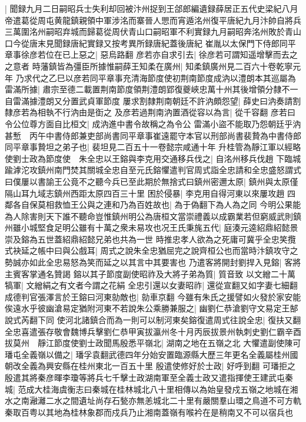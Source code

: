 |{
	聞録九月二日嗣昭兵士失利却回被汴州捉到王郃郎編遺録薛居正五代史梁紀八月帝遣葛從周屯黄龍鎮親領中軍涉洺而寨晉人愳而宵遁洺州復平唐紀九月汴帥自將兵三萬圍洺州嗣昭弃城而歸葛從周伏青山口嗣昭軍不利實録九月嗣昭奔洺州敗於青山口今從唐末見聞録唐紀實録又按考異所録唐紀蓋後唐紀}
崔胤以太保門下侍郎同平章事徐彦若位在已上惡之|{
	惡烏路翻}
彦若亦自求引去|{
	徐彦若可謂知遥增擊而去之之意者}
時藩鎮皆為彊臣所據惟嗣薛王知柔在廣州|{
	知柔鎮廣州見二百六十卷乾寧元年}
乃求代之乙巳以彦若同平章事充清海節度使初荆南節度成汭以澧朗本其巡屬為雷滿所據|{
	肅宗至德二載置荆南節度領荆澧朗郢復夔峽忠萬十州其後增領分隸不一自雷滿據澧朗又分置武貞軍節度}
屢求割隸荆南朝廷不許汭頗怨望|{
	薛史曰汭奏請割隸彦若為相執不行汭由是衘之}
及彦若過荆南汭置酒從容以為言|{
	從千容翻}
彦若曰令公位尊方面自比桓文|{
	成汭進中書令故稱之為令公}
雷滿小盜不能取乃怨朝廷乎汭甚慙　丙午中書侍郎兼吏部尚書同平章事崔遠罷守本官以刑部尚書裴贄為中書侍郎同平章事贄坦之弟子也|{
	裴坦見二百五十一卷懿宗咸通十年}
升桂管為靜江軍以經略使劉士政為節度使　朱全忠以王鎔與李克用交通移兵伐之|{
	自洺州移兵伐趙}
下臨城踰滹沱攻鎮州南門焚其關城全忠自至元氏鎔懼遣判官周式詣全忠請和全忠盛怒謂式曰僕屢以書諭王公竟不之聽今兵已至此期於無捨式曰鎮州密邇太原|{
	鎮州與太原僅隔山耳九域志鎮州西距太原四百三十里}
困於侵暴|{
	李克用自得河東以來屢攻趙}
四鄰各自保莫相救恤王公與之連和乃為百姓故也|{
	為于偽翻下為人為之同}
今明公果能為人除害則天下誰不聽命豈惟鎮州明公為唐桓文當崇禮義以成霸業若但窮威武則鎮州雖小城堅食足明公雖有十萬之衆未易攻也况王氏秉旄五代|{
	庭湊元逵紹鼎紹懿景崇及鎔為五世蓋紹鼎紹懿兄弟也共為一世}
時推忠孝人欲為之死庸可冀乎全忠笑攬式袂延之帳中曰與公戲耳|{
	周式之說朱全忠猶屈完之說齊桓公也而當時汴鎮攻守之勢誠亦如此全忠易怒為笑而延之以其言中其要害也}
乃遣客將開封劉捍入見鎔|{
	客將主賓客掌通名贊謁}
鎔以其子節度副使昭祚及大將子弟為質|{
	質音致}
以文繒二十萬犒軍|{
	文繒絹之有文者今謂之花絹}
全忠引還以女妻昭祚|{
	還從宣翻又如字妻七細翻}
成德判官張澤言於王鎔曰河東勍敵也|{
	勍車京翻}
今雖有朱氏之援譬如火發於家安能俟遠水乎彼幽滄易定猶附河東不若說朱公乘勝兼服之|{
	幽劉仁恭滄劉守文易定王郜說式芮翻下同}
使河北諸鎮合而為一則可以制河東矣鎔復遣周式往說全忠|{
	復扶又翻}
全忠喜遣張存敬會魏博兵擊劉仁恭甲寅拔瀛州冬十月丙辰拔景州執刺史劉仁霸辛酉拔莫州　靜江節度使劉士政聞馬殷悉平嶺北|{
	湖南之地在五嶺之北}
大懼遣副使陳可璠屯全義嶺以備之|{
	璠孚袁翻武德四年分始安置臨源縣大歷三年更名全義屬桂州國朝改全義為興安縣在桂州東北一百五十里}
殷遣使修好於士政|{
	好呼到翻}
可璠拒之殷遣其將秦彦暉李瓊等將兵七千擊士政湖南軍至全義士政又遣指揮使王建武屯秦城|{
	范成大桂海虞衡志曰秦城在桂林城北八十里相傳以為始皇發戍五嶺之地城在湘水之南瀜灕二水之間遺址尚存石甃亦無恙城北二十里有嚴關羣山環之鳥道不可方軌秦取百粤以其地為桂林象郡而戍兵乃止湘南蓋嶺有喉衿在是稍南又不可以宿兵也}
